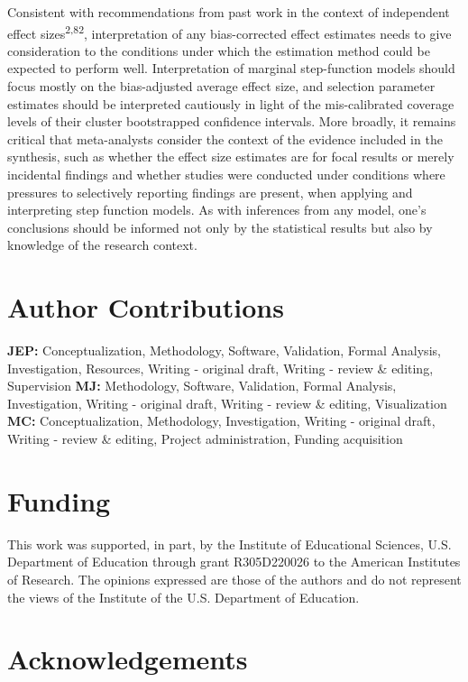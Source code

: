 \documentclass[
  american,
  man, donotrepeattitle,floatsintext]{apa7}
\begin{document}
Consistent with recommendations from past work in the context of independent effect sizes\textsuperscript{2,82}, interpretation of any bias-corrected effect estimates needs to give consideration to the conditions under which the estimation method could be expected to perform well.
Interpretation of marginal step-function models should focus mostly on the bias-adjusted average effect size, and selection parameter estimates should be interpreted cautiously in light of the mis-calibrated coverage levels of their cluster bootstrapped confidence intervals.
More broadly, it remains critical that meta-analysts consider the context of the evidence included in the synthesis, such as whether the effect size estimates are for focal results or merely incidental findings and whether studies were conducted under conditions where pressures to selectively reporting findings are present, when applying and interpreting step function models.
As with inferences from any model, one's conclusions should be informed not only by the statistical results but also by knowledge of the research context.

\section*{Author Contributions}\label{author-contributions}

\textbf{JEP:} Conceptualization, Methodology, Software, Validation, Formal Analysis, Investigation, Resources, Writing - original draft, Writing - review \& editing, Supervision \textbf{MJ:} Methodology, Software, Validation, Formal Analysis, Investigation, Writing - original draft, Writing - review \& editing, Visualization \textbf{MC:} Conceptualization, Methodology, Investigation, Writing - original draft, Writing - review \& editing, Project administration, Funding acquisition

\section*{Funding}\label{funding}

This work was supported, in part, by the Institute of Educational Sciences, U.S. Department of Education through grant R305D220026 to the American Institutes of Research.
The opinions expressed are those of the authors and do not represent the views of the Institute of the U.S. Department of Education.

\section*{Acknowledgements}\label{acknowledgements}
\end{document}
